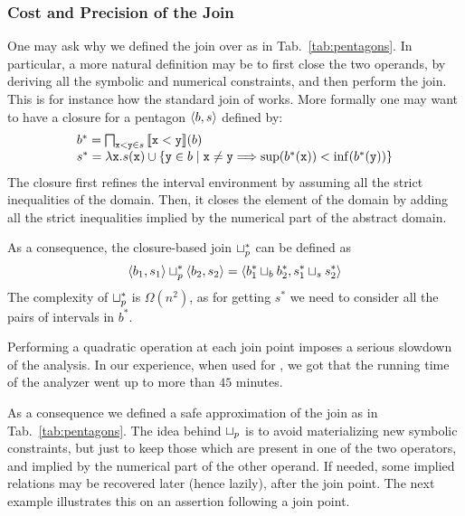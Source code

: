 \documentclass{sig-alternate}
\begin{document}
\subsubsection*{Cost and Precision of the Join}
One may ask why we defined the join over \Pentagons{} as in Tab.~\ref{tab:pentagons}.
In particular, a more natural definition may be to first close the two operands, by deriving all the symbolic and numerical constraints, and then perform the join.
This is for instance how the standard join of \Octagons{} works.
More formally one may want to have a closure for a pentagon $\langle b,
  s \rangle$ defined by:
\[
\begin{array}{l}
b^* = \bigsqcap_{\mathtt{x} < \mathtt{y} \in s} \mathbb{}\llbracket \mathtt{\mathtt{x} < \mathtt{y}} \rrbracket(b) \\
s^* = \lambda \mathtt{x}. s(\mathtt{x}) \cup \{ \mathtt{y} \in b\mid \mathtt{x} \neq \mathtt{y} \Longrightarrow \mathrm{sup}(b^*(\mathtt{x})) < \mathrm{inf}(b^*(\mathtt{y}))\} 
\end{array}
\]
The closure first refines  the interval environment by assuming all the strict inequalities of the \SUB{} domain.
Then, it closes the element of the \SUB{} domain by adding all the strict inequalities implied by the numerical part of the abstract domain.

As a consequence, the closure-based join $\sqcup_p^*$ can be defined as 
\[
\langle b_1, s_1 \rangle \sqcup_p^* \langle b_2, s_2 \rangle = \langle b_1^* \sqcup_b b_2^*, s_1^* \sqcup_s s_2^*  \rangle 
\]
The complexity of $\sqcup_p^*$ is $\Omega(n^2)$, as for getting  $s^*$  we need to consider all the pairs of intervals in $b^*$.

Performing a quadratic operation at each join point imposes a serious
slowdown of the analysis.
In our experience, when used for , we got that the running time of the analyzer went up to more than $45$ minutes. 

As a consequence we defined a safe approximation of the join as in Tab.~\ref{tab:pentagons}.
The idea behind $\sqcup_p$ is to avoid materializing new symbolic constraints, but just to keep those which are present in one of the two operators, and implied by the numerical part of the other operand.
If needed, some implied relations may be recovered later (hence lazily),
after the join point. The next example illustrates this on an
assertion following a join point.
\end{document}
